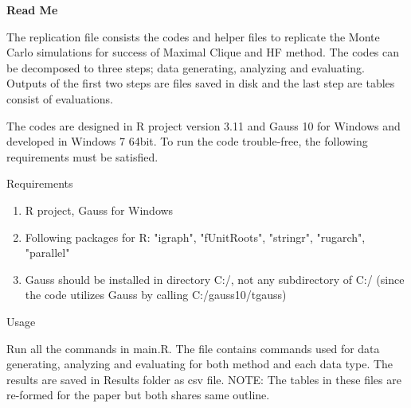 \documentclass{article}
\begin{document}
\begin{center}
	\Large \bf Read Me 
\end{center}
The replication file consists the codes and helper files to replicate the Monte Carlo simulations for success of Maximal Clique and HF method. The codes can be decomposed to three steps; data generating, analyzing and evaluating. Outputs of the first two steps are files saved in disk and the last step are tables consist of evaluations.

The codes are designed in R project version 3.11 and Gauss 10 for Windows and developed in Windows 7 64bit. To run the code trouble-free, the following requirements must be satisfied.
\begin{flushleft}
	\large Requirements
\end{flushleft}
\begin{enumerate}
\item R project, Gauss for Windows
\item Following packages for R: "igraph", "fUnitRoots", "stringr", "rugarch", "parallel"
\item Gauss should be installed in directory C:/, not any subdirectory of C:/ (since the code utilizes Gauss by calling C:/gauss10/tgauss)

\end{enumerate}

\begin{flushleft}
	\large Usage
\end{flushleft}
Run all the commands in main.R. The file contains commands used for data generating, analyzing and evaluating for both method and each data type. The results are saved in Results folder as csv file. NOTE: The tables in these files are re-formed for the paper but both shares same outline.
\end{document}
